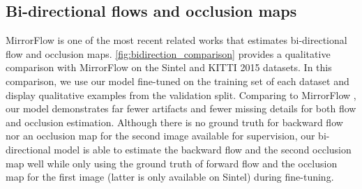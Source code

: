 \documentclass[10pt,twocolumn,letterpaper]{article}
\begin{document}
\begin{figure*}[t]
\begin{figure*}[t]
\begin{minipage}{0.245\textwidth}
\subsection{Bi-directional flows and occlusion maps}

MirrorFlow \cite{Hur:2017:MFE} is one of the most recent related works that estimates bi-directional flow and occlusion maps.
\cref{fig:bidirection_comparison} provides a qualitative comparison with MirrorFlow \cite{Hur:2017:MFE} on the Sintel and KITTI 2015 datasets.
In this comparison, we use our model fine-tuned on the training set of each dataset and display qualitative examples from the validation split.
Comparing to MirrorFlow \cite{Hur:2017:MFE}, our model demonstrates far fewer artifacts and fewer missing details for both flow and occlusion estimation. 
Although there is no ground truth for backward flow nor an occlusion map for the second image available for supervision, our bi-directional model is able to estimate the backward flow and the second occlusion map well while only using the ground truth of forward flow and the occlusion map for the first image (latter is only available on Sintel) during fine-tuning.


{
\begin{figure*}[!b]
\centering
\scriptsize
\setlength\tabcolsep{0.3pt}
\renewcommand{\arraystretch}{0.2}
\begin{tabular}{>{\centering\arraybackslash}m{} >{\centering\arraybackslash}m{} >{\centering\arraybackslash}m{} >{\centering\arraybackslash}m{} >{\centering\arraybackslash}m{}}



\end{tabular}
\end{figure*}}
\end{minipage}
\end{figure*}
\end{figure*}
\end{document}
